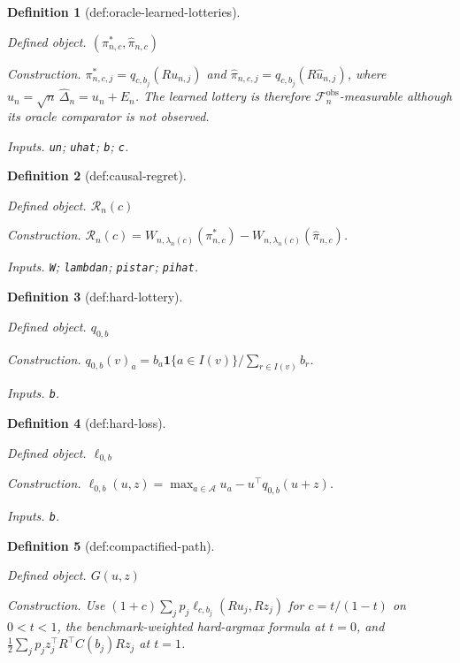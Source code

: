 \documentclass{article}
\newtheorem{definition}{Definition}
\begin{document}
\begin{definition}[def:oracle-learned-lotteries]\label{def:oracle-learned-lotteries}
\par\smallskip\noindent\emph{Defined object.} \((\pi^*_{n,c},\widehat\pi_{n,c})\)
\par\smallskip\noindent\emph{Construction.} \(\pi^*_{n,c,j}=q_{c,b_j}(Ru_{n,j})\) and \(\widehat\pi_{n,c,j}=q_{c,b_j}(R\widehat u_{n,j})\), where \(\widehat u_n=\sqrt n\,\widehat\Delta_n=u_n+E_n\). The learned lottery is therefore \(\mathcal F_n^{\mathrm{obs}}\)-measurable although its oracle comparator is not observed.
\par\smallskip\noindent\emph{Inputs.} \texttt{un}; \texttt{uhat}; \texttt{b}; \texttt{c}.
\end{definition}

\begin{definition}[def:causal-regret]\label{def:causal-regret}
\par\smallskip\noindent\emph{Defined object.} \(\mathscr R_n(c)\)
\par\smallskip\noindent\emph{Construction.} \(\mathscr R_n(c)=W_{n,\lambda_n(c)}(\pi^*_{n,c})-W_{n,\lambda_n(c)}(\widehat\pi_{n,c})\).
\par\smallskip\noindent\emph{Inputs.} \texttt{W}; \texttt{lambdan}; \texttt{pistar}; \texttt{pihat}.
\end{definition}

\begin{definition}[def:hard-lottery]\label{def:hard-lottery}
\par\smallskip\noindent\emph{Defined object.} \(q_{0,b}\)
\par\smallskip\noindent\emph{Construction.} \(q_{0,b}(v)_a=b_a\mathbf 1\{a\in I(v)\}\big/\sum_{r\in I(v)}b_r\).
\par\smallskip\noindent\emph{Inputs.} \texttt{b}.
\end{definition}

\begin{definition}[def:hard-loss]\label{def:hard-loss}
\par\smallskip\noindent\emph{Defined object.} \(\ell_{0,b}\)
\par\smallskip\noindent\emph{Construction.} \(\ell_{0,b}(u,z)=\max_{a\in\mathcal A}u_a-u^{\top}q_{0,b}(u+z)\).
\par\smallskip\noindent\emph{Inputs.} \texttt{b}.
\end{definition}

\begin{definition}[def:compactified-path]\label{def:compactified-path}
\par\smallskip\noindent\emph{Defined object.} \(G(u,z)\)
\par\smallskip\noindent\emph{Construction.} Use \((1+c)\sum_jp_j\ell_{c,b_j}(Ru_j,Rz_j)\) for \(c=t/(1-t)\) on \(0<t<1\), the benchmark-weighted hard-argmax formula at \(t=0\), and \(\frac12\sum_jp_jz_j^{\top}R^{\top}C(b_j)Rz_j\) at \(t=1\).
\end{definition}
\end{document}
